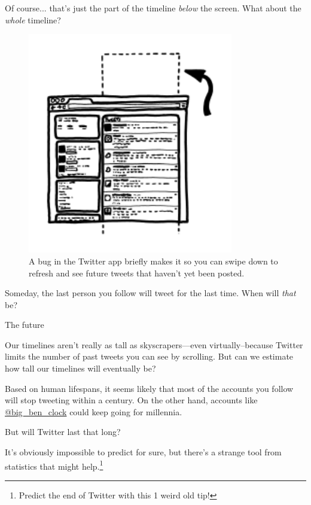 {{Of course... that's just the part of the timeline \emph{below} the screen. What about the \emph{whole} timeline?}

\begin{figure}[!htbp]
\centering
\includegraphics[scale=0.5, max width=0.8\textwidth]{imgs/a/65/timeline_future.png}
\caption{A bug in the Twitter app briefly makes it so you can swipe down to refresh and see future tweets that haven't yet been posted.}
\end{figure}

{Someday, the last person you follow will tweet for the last time. When will \emph{that} be?}

{The future}

{Our timelines aren't really as tall as skyscrapers—even virtually–because Twitter limits the number of past tweets you can see by scrolling. But can we estimate how tall our timelines will eventually be?}

{Based on human lifespans, it seems likely that most of the accounts you follow will stop tweeting within a century. On the other hand, accounts like \href{https://twitter.com/big\_ben\_clock}{@big\_ben\_clock} could keep going for millennia.}

{But will Twitter last that long?}

{It's obviously impossible to predict for sure, but there's a strange tool from statistics that might help.{\footnote{Predict the end of Twitter with this 1 weird old tip!} } }

}
